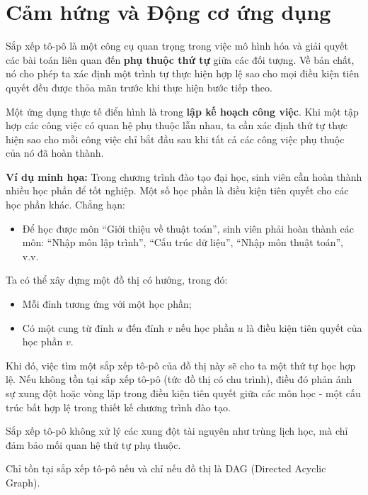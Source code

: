 \section{Cảm hứng và Động cơ ứng dụng}

Sắp xếp tô-pô là một công cụ quan trọng trong việc mô hình hóa và giải quyết các bài toán liên quan đến \textbf{phụ thuộc thứ tự} giữa các đối tượng. Về bản chất, nó cho phép ta xác định một trình tự thực hiện hợp lệ sao cho mọi điều kiện tiên quyết đều được thỏa mãn trước khi thực hiện bước tiếp theo.

Một ứng dụng thực tế điển hình là trong \textbf{lập kế hoạch công việc}. Khi một tập hợp các công việc có quan hệ phụ thuộc lẫn nhau, ta cần xác định thứ tự thực hiện sao cho mỗi công việc chỉ bắt đầu sau khi tất cả các công việc phụ thuộc của nó đã hoàn thành.

\textbf{Ví dụ minh họa:} Trong chương trình đào tạo đại học, sinh viên cần hoàn thành nhiều học phần để tốt nghiệp. Một số học phần là điều kiện tiên quyết cho các học phần khác. Chẳng hạn:
\begin{itemize}
    \item Để học được môn ``Giới thiệu về thuật toán'', sinh viên phải hoàn thành các môn: ``Nhập môn lập trình'', ``Cấu trúc dữ liệu'', ``Nhập môn thuật toán'', v.v.
\end{itemize}

Ta có thể xây dựng một đồ thị có hướng, trong đó:
\begin{itemize}
    \item Mỗi đỉnh tương ứng với một học phần;
    \item Có một cung từ đỉnh \( u \) đến đỉnh \( v \) nếu học phần \( u \) là điều kiện tiên quyết của học phần \( v \).
\end{itemize}

Khi đó, việc tìm một sắp xếp tô-pô của đồ thị này sẽ cho ta một thứ tự học hợp lệ. Nếu không tồn tại sắp xếp tô-pô (tức đồ thị có chu trình), điều đó phản ánh sự xung đột hoặc vòng lặp trong điều kiện tiên quyết giữa các môn học - một cấu trúc bất hợp lệ trong thiết kế chương trình đào tạo.

\begin{ghichu}
Sắp xếp tô-pô không xử lý các xung đột tài nguyên như trùng lịch học, mà chỉ đảm bảo mối quan hệ thứ tự phụ thuộc.
\end{ghichu}


\begin{ghichu}
Chỉ tồn tại sắp xếp tô-pô nếu và chỉ nếu đồ thị là DAG (Directed Acyclic Graph).

\end{ghichu}


